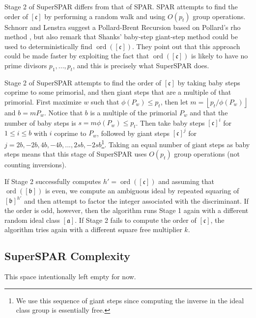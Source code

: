 \documentclass{ucalgthes1}
\theoremstyle{definition}
\DeclareMathOperator{\ord}{ord}
\newcommand{\floor}[1]{\left\lfloor #1 \right\rfloor}
\newcommand{\aclass}{[\mathfrak a]}
\newcommand{\bclass}{[\mathfrak b]}
\newcommand{\cclass}{[\mathfrak c]}
\begin{document}
Stage 2 of SuperSPAR differs from that of SPAR.  SPAR attempts to find the order of $\cclass$ by performing a random walk and using $O(p_t)$ group operations.  Schnorr and Lenstra \cite[p.294]{Schnorr1984} suggest a Pollard-Brent Recursion \cite{Brent1980} based on Pollard's rho method \cite{Pollard1975}, but also remark \cite[p.298]{Schnorr1984} that Shanks' baby-step giant-step method \cite{Shanks1971} could be used to deterministically find $\ord(\cclass)$.  They point out that this approach could be made faster by exploiting the fact that $\ord(\cclass)$ is likely to have no prime divisors $p_1, ..., p_t$, and this is precisely what SuperSPAR does.

Stage 2 of SuperSPAR attempts to find the order of $\cclass$ by taking baby steps coprime to some primorial, and then giant steps that are a multiple of that primorial.  First maximize $w$ such that $\phi(P_w) \le p_t$, then let $m = \floor{p_t / \phi(P_w)}$ and $b = mP_w$.  Notice that $b$ is a multiple of the primorial $P_w$ and that the number of baby steps is $s = m \phi(P_w) \le p_t$.  Then take baby steps $\cclass^i$ for $1 \le i \le b$ with $i$ coprime to $P_w$, followed by giant steps $\cclass^j$ for $j=2b,-2b,4b,-4b,...,2sb,-2sb$\footnote{We use this sequence of giant steps since computing the inverse in the ideal class group is essentially free.}.  Taking an equal number of giant steps as baby steps means that this stage of SuperSPAR uses $O(p_t)$ group operations (not counting inversions).

If Stage 2 successfully computes $h' = \ord(\cclass)$ and assuming that $\ord(\bclass)$ is even, we compute an ambiguous ideal by repeated squaring of $\bclass^{h'}$ and then attempt to factor the integer associated with the discriminant.  If the order is odd, however, then the algorithm runs Stage 1 again with a different random ideal class $\aclass$.  If Stage 2 fails to compute the order of $\cclass$, the algorithm tries again with a different square free multiplier $k$.


\subsection{SuperSPAR Complexity}


This space intentionally left empty for now.
\end{document}
